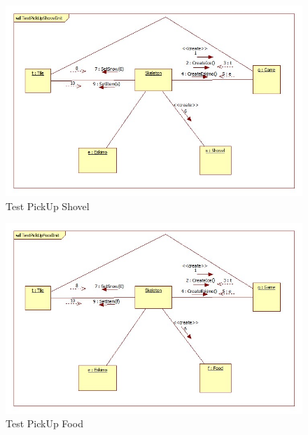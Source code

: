\begin{figure}[H]
	\begin{center}
		\includegraphics[width=17cm]{chapters/chapter05/diagrams/TestPickUpShovelInit.jpg}
		\caption{Test PickUp Shovel}
		\label{fig:Test PickUp Shovel}
	\end{center}
\end{figure}

\begin{figure}[H]
	\begin{center}
		\includegraphics[width=17cm]{chapters/chapter05/diagrams/TestPickUpFoodInit.jpg}
		\caption{Test PickUp Food}
		\label{fig:Test PickUp Food}
	\end{center}
\end{figure}

